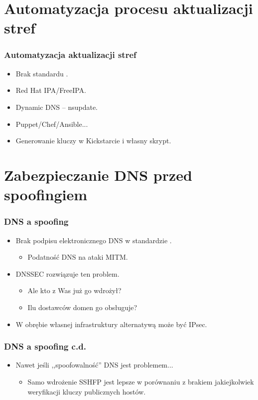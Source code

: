 \documentclass[dvipsnames,table]{beamer}
\begin{document}
\section{Automatyzacja procesu aktualizacji stref}

\begin{frame}
\frametitle{Automatyzacja aktualizacji stref}
\begin{itemize}
	\item Brak standardu \Sadey.
	\item Red Hat IPA/FreeIPA.
	\item Dynamic DNS -- nsupdate.
	\item Puppet/Chef/Ansible...
	\item Generowanie kluczy w Kickstarcie i własny skrypt.
\end{itemize}
\end{frame}

\section{Zabezpieczanie DNS przed spoofingiem}

\begin{frame}
\frametitle{DNS a spoofing}
\begin{itemize}
	\item Brak podpisu elektronicznego DNS w standardzie \Sadey.
	\begin{itemize}
		\item Podatność DNS na ataki MITM.
	\end{itemize}
	\item DNSSEC rozwiązuje ten problem.
	\begin{itemize}
		\item Ale kto z Was już go wdrożył?
		\item Ilu dostawców domen go obsługuje?
	\end{itemize}
	\item W obrębie własnej infrastruktury alternatywą może być IPsec.
\end{itemize}
\end{frame}

\begin{frame}
\frametitle{DNS a spoofing c.d.}
\begin{itemize}
	\item Nawet jeśli ,,spoofowalność'' DNS jest problemem...
	\begin{itemize}
		\item Samo wdrożenie SSHFP jest lepsze w porównaniu z brakiem jakiejkolwiek weryfikacji kluczy publicznych hostów.
	\end{itemize}

\end{itemize}
\end{frame}
\end{document}

